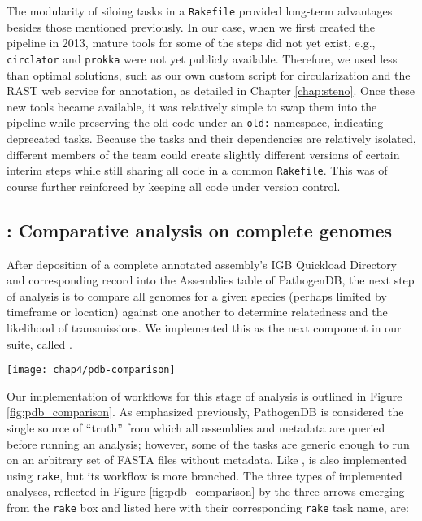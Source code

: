 The modularity of siloing tasks in a \texttt{Rakefile} provided long-term advantages besides those mentioned previously. In our case, when we first created the pipeline in 2013, mature tools for some of the steps did not yet exist, e.g., \texttt{circlator} and \texttt{prokka} were not yet publicly available. Therefore, we used less than optimal solutions, such as our own custom script for circularization and the RAST web service\autocite{Aziz2008} for annotation, as detailed in Chapter \ref{chap:steno}. Once these new tools became available, it was relatively simple to swap them into the pipeline while preserving the old code under an \texttt{old:} namespace, indicating deprecated tasks. Because the tasks and their dependencies are relatively isolated, different members of the team could create slightly different versions of certain interim steps while still sharing all code in a common \texttt{Rakefile}. This was of course further reinforced by keeping all code under version control.

\subsection{\pathogendbcomparison: Comparative analysis on complete genomes}

After deposition of a complete annotated assembly's IGB Quickload Directory and corresponding record into the Assemblies table of PathogenDB, the next step of analysis is to compare all genomes for a given species (perhaps limited by timeframe or location) against one another to determine relatedness and the likelihood of transmissions. We implemented this as the next component in our suite, called \pathogendbcomparison.

\begin{figure*}[htb]
  \texttt{[image: chap4/pdb-comparison]}               
  \caption[Outline of steps automated by \pathogendbcomparison]{\textbf{Outline of steps automated by \pathogendbcomparison.} Processes are depicted as boxes, with processes requiring potentially multiple runs indicated as a ``stack.'' An interim file format is depicted as a single arrow, and groups of files as doubled arrows. The pipeline concludes with various outputs being sent to \pathogendbviz for further visualization.}
  \label{fig:pdb_comparison}
\end{figure*}

Our implementation of workflows for this stage of analysis is outlined in Figure \ref{fig:pdb_comparison}. As emphasized previously, PathogenDB is considered the single source of ``truth'' from which all assemblies and metadata are queried before running an analysis; however, some of the tasks are generic enough to run on an arbitrary set of FASTA files without metadata. Like \pathogendbpipeline, \pathogendbcomparison is also implemented using \texttt{rake}, but its workflow is more branched. The three types of implemented analyses, reflected in Figure \ref{fig:pdb_comparison} by the three arrows emerging from the \texttt{rake} box and listed here with their corresponding \texttt{rake} task name, are:

